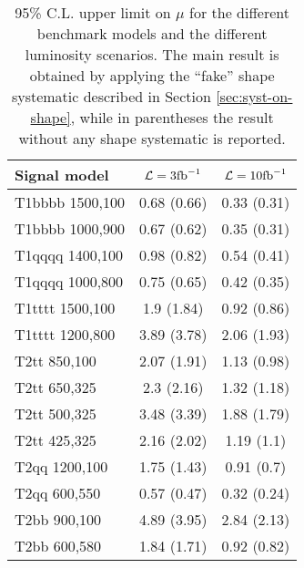 \begin{table}
  \centering
  \caption{95\% C.L. upper limit on $\mu$ for the different benchmark models and the different luminosity scenarios. 
  The main result is obtained by applying 
  the ``fake'' shape systematic described in Section \ref{sec:syst-on-shape}, while in parentheses the result without any shape systematic is reported.}
  \label{tab:results_ul}
  \footnotesize
  \begin{tabular}{lcc}
    \hline
    \hline
    Signal model & $\mathcal{L} = 3 \text{fb}^{-1}$ & $\mathcal{L} = 10 \text{fb}^{-1}$ \\
    \hline
    \hline
    T1bbbb 1500,100  & 0.68 (0.66) & 0.33 (0.31) \\ 
    T1bbbb 1000,900  & 0.67 (0.62) & 0.35 (0.31) \\ 
    T1qqqq 1400,100  & 0.98 (0.82) & 0.54 (0.41) \\ 
    T1qqqq 1000,800  & 0.75 (0.65) & 0.42 (0.35) \\ 
    T1tttt 1500,100  & 1.9 (1.84) & 0.92 (0.86) \\  
    T1tttt 1200,800  & 3.89 (3.78) & 2.06 (1.93) \\ \hline
    T2tt 850,100     & 2.07 (1.91) & 1.13 (0.98) \\ 
    T2tt 650,325     & 2.3 (2.16) & 1.32 (1.18) \\  
    T2tt 500,325     & 3.48 (3.39) & 1.88 (1.79) \\ 
    T2tt 425,325     & 2.16 (2.02) & 1.19 (1.1) \\  
    T2qq 1200,100    & 1.75 (1.43) & 0.91 (0.7) \\  
    T2qq 600,550     & 0.57 (0.47) & 0.32 (0.24) \\ 
    T2bb 900,100     & 4.89 (3.95) & 2.84 (2.13) \\ 
    T2bb 600,580     & 1.84 (1.71) & 0.92 (0.82) \\ 
    \hline
    \hline
  \end{tabular} 
\end{table}


